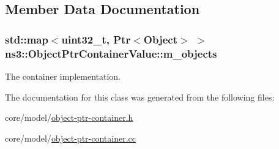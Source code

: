 \subsection{Member Data Documentation}
\subsubsection[{\texorpdfstring{m\+\_\+objects}{m_objects}}]{\setlength{\rightskip}{0pt plus 5cm}std\+::map$<$uint32\+\_\+t, {\bf Ptr}$<${\bf Object}$>$ $>$ ns3\+::\+Object\+Ptr\+Container\+Value\+::m\+\_\+objects\hspace{0.3cm}{\ttfamily [private]}}\hypertarget{classns3_1_1ObjectPtrContainerValue_ae30f64004994878b88193732c42c6d38}{}\label{classns3_1_1ObjectPtrContainerValue_ae30f64004994878b88193732c42c6d38}
The container implementation. 

The documentation for this class was generated from the following files\+:\begin{DoxyCompactItemize}
\item 
core/model/\hyperlink{object-ptr-container_8h}{object-\/ptr-\/container.\+h}\item 
core/model/\hyperlink{object-ptr-container_8cc}{object-\/ptr-\/container.\+cc}\end{DoxyCompactItemize}
